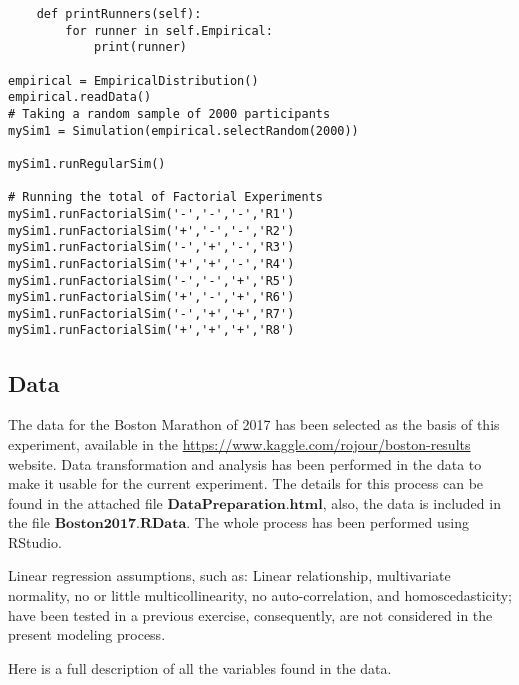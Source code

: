 \documentclass[11pt, oneside]{article}   	%
\begin{document}
\begin{lstlisting}
    def printRunners(self):
        for runner in self.Empirical:
            print(runner)

empirical = EmpiricalDistribution()
empirical.readData()
# Taking a random sample of 2000 participants
mySim1 = Simulation(empirical.selectRandom(2000))

mySim1.runRegularSim()

# Running the total of Factorial Experiments
mySim1.runFactorialSim('-','-','-','R1')
mySim1.runFactorialSim('+','-','-','R2')
mySim1.runFactorialSim('-','+','-','R3')
mySim1.runFactorialSim('+','+','-','R4')
mySim1.runFactorialSim('-','-','+','R5')
mySim1.runFactorialSim('+','-','+','R6')
mySim1.runFactorialSim('-','+','+','R7')
mySim1.runFactorialSim('+','+','+','R8')
\end{lstlisting}

\subsection{Data}

The data for the Boston Marathon of 2017 has been selected as the basis of this experiment, available in the \url{https://www.kaggle.com/rojour/boston-results} website. Data transformation and analysis has been performed in the data to make it usable for the current experiment. The details for this process can be found in the attached file $\textbf{DataPreparation.html}$, also, the data is included in the file $\textbf{Boston2017.RData}$. The whole process has been performed using RStudio.

Linear regression assumptions, such as: Linear relationship, multivariate normality, no or little multicollinearity, no auto-correlation, and homoscedasticity; have been tested in a previous exercise, consequently, are not considered in the present modeling process.

Here is a full description of all the variables found in the data.
\end{document}
